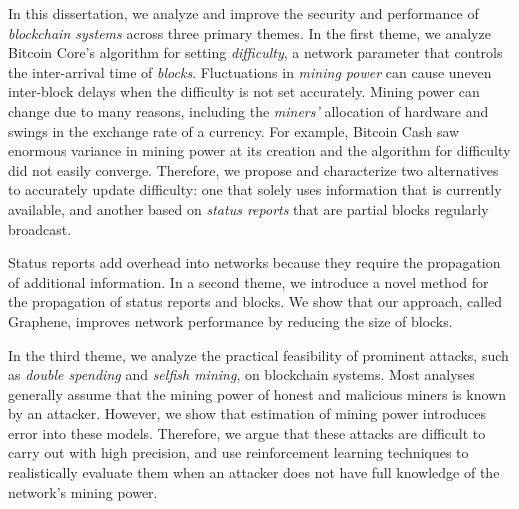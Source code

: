 
In this dissertation, we analyze and improve the security and performance of {\em blockchain systems} across three primary themes. In the first theme, we analyze Bitcoin Core's algorithm for setting \textit{difficulty}, a network parameter that controls the inter-arrival time of \textit{blocks}. Fluctuations in \textit{mining power} can cause uneven inter-block delays when the difficulty is not set accurately.  Mining power can change due to many reasons, including the \textit{miners'} allocation of hardware and swings in the exchange rate of a currency.  For example, Bitcoin Cash saw enormous variance in mining power at its creation and the algorithm for difficulty did not easily converge. Therefore, we propose and characterize two alternatives to accurately update difficulty: one that solely uses information that is currently available, and another based on \textit{status reports} that are partial blocks regularly broadcast.

Status reports add overhead into networks because they require the propagation of additional information. In a second theme, we introduce a novel method for the propagation of status reports and blocks. We show that our approach, called Graphene, improves network performance by reducing the size of blocks.

In the third theme, we analyze the practical feasibility of prominent attacks, such as \textit{double spending} and \textit{selfish mining}, on blockchain systems. Most analyses generally assume that the mining power of honest and malicious miners is known by an attacker. However, we show that estimation of mining power introduces error into these models. Therefore, we argue that these attacks are difficult to carry out with high precision, and use reinforcement learning techniques to realistically evaluate them when an attacker does not have full knowledge of the network's mining power.
